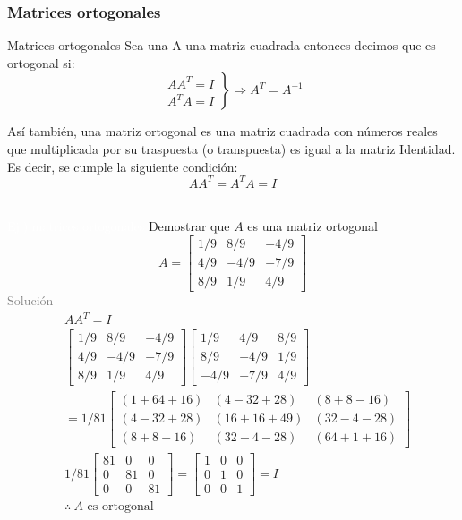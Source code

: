 \subsubsection{Matrices ortogonales}
\begin{Theorem*} {Matrices ortogonales}
	Sea una A una matriz cuadrada entonces decimos que es ortogonal si:
	$$
	\left.\begin{array} {cc}
		AA^T=I \\
		A^TA=I
	\end{array}\right\}\Longrightarrow A^T=A^{-1}
	$$
\end{Theorem*}
Así también, una matriz ortogonal es una matriz cuadrada con números reales que multiplicada por su traspuesta (o transpuesta) es igual a la matriz Identidad. Es decir, se cumple la siguiente condición:
$$ AA^T=A^TA=I $$ \\
\addtocounter{exr}{1} 
\colorbox{gray!55}{\textcolor{white}{Ej.) matrices ortogonales}}
	Demostrar que $A$ es una matriz ortogonal
	$$ A=\begin{bmatrix}
		1/9 & 8/9 & -4/9 \\
		4/9 & -4/9 & -7/9 \\
		8/9 & 1/9 & 4/9
	\end{bmatrix} $$
\textcolor{gray}{Solución }
	\begin{align*}
		&AA^T=I \\
		&\begin{bmatrix}
			1/9 & 8/9 & -4/9 \\
			4/9 & -4/9 & -7/9 \\
			8/9 & 1/9 & 4/9
		\end{bmatrix}\begin{bmatrix}
			1/9 & 4/9 & 8/9 \\
			8/9 & -4/9 & 1/9 \\
			-4/9 & -7/9 & 4/9
		\end{bmatrix} \\
		&=1/81\left[\begin{smallmatrix}
			(1+64+16) & (4-32+28) & (8+8-16) \\
			(4-32+28) & (16+16+49) & (32-4-28) \\
			(8+8-16) & (32-4-28) & (64+1+16)
		\end{smallmatrix}\right] \\
		&1/81\begin{bmatrix}
			81 & 0 & 0 \\
			0 & 81 & 0 \\
			0 & 0 & 81
		\end{bmatrix} = \begin{bmatrix}
			1 & 0 & 0 \\
			0 & 1 & 0 \\
			0 & 0 & 1
		\end{bmatrix} = I \\
		&\therefore \ A \text{ es ortogonal}
	\end{align*}
\hspace*{\fill}\colorbox{gray!55}{ } \\